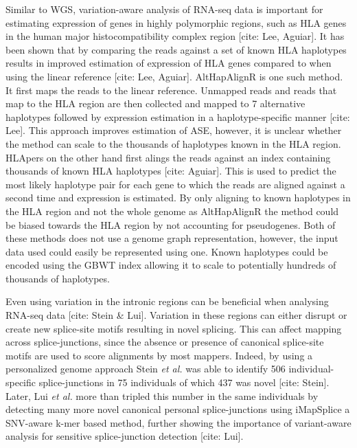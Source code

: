 Similar to WGS, variation-aware analysis of RNA-seq data is important for estimating expression of genes in highly polymorphic regions, such as HLA genes in the human major histocompatibility complex region [cite: Lee, Aguiar]. 
It has been shown that by comparing the reads against a set of known HLA haplotypes results in improved estimation of expression of HLA genes compared to when using the linear reference [cite: Lee, Aguiar].
AltHapAlignR is one such method. It first maps the reads to the linear reference. Unmapped reads and reads that map to the HLA region are then collected and mapped to 7 alternative haplotypes followed by expression estimation in a haplotype-specific manner [cite: Lee]. 
This approach improves estimation of ASE, however, it is unclear whether the method can scale to the thousands of haplotypes known in the HLA region.
HLApers on the other hand first alings the reads against an index containing thousands of known HLA haplotypes [cite: Aguiar]. 
This is used to predict the most likely haplotype pair for each gene to which the reads are aligned against a second time and expression is estimated. 
By only aligning to known haplotypes in the HLA region and not the whole genome as AltHapAlignR the method could be biased towards the HLA region by not accounting for pseudogenes.
Both of these methods does not use a genome graph representation, however, the input data used could easily be represented using one.
Known haplotypes could be encoded using the GBWT index allowing it to scale to potentially hundreds of thousands of haplotypes. 

Even using variation in the intronic regions can be beneficial when analysing RNA-seq data [cite: Stein \& Lui]. 
Variation in these regions can either disrupt or create new splice-site motifs resulting in novel splicing. 
This can affect mapping across splice-junctions, since the absence or presence of canonical splice-site motifs are used to score alignments by most mappers. 
Indeed, by using a personalized genome approach Stein \textit{et al.} was able to identify 506 individual-specific splice-junctions in 75 individuals of which 437 was novel [cite: Stein]. 
Later, Lui \textit{et al.} more than tripled this number in the same individuals by detecting many more novel canonical personal splice-junctions using iMapSplice a SNV-aware k-mer based method, further showing the importance of variant-aware analysis for sensitive splice-junction detection [cite: Lui]. 


